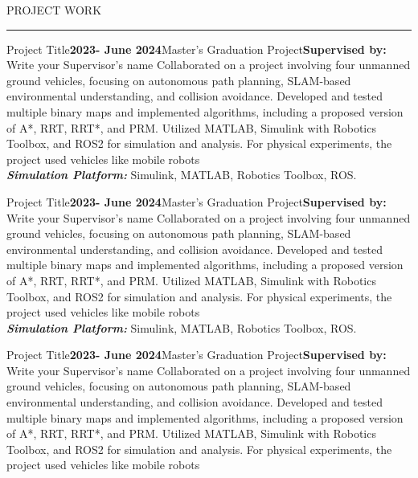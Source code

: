 \documentclass{resume} %
\renewenvironment{rSection}[1]{
\sectionskip
\textcolor{RoyalPurple}{\MakeUppercase{#1}}
\sectionlineskip
\hrule
\begin{list}{}{
\setlength{\leftmargin}{1.5em}
}
\item[]
}{
\end{list}
}
\begin{document}
\begin{rSection}{Project Work}


\begin{rSubsection}{Project Title}{\textbf{2023- June 2024}}{Master's Graduation Project}{\textbf{Supervised by:}  Write your Supervisor's name}
Collaborated on a project involving four unmanned ground vehicles, focusing on autonomous path planning, SLAM-based environmental understanding, and collision avoidance. Developed and tested multiple binary maps and implemented algorithms, including a proposed version of A*, RRT, RRT*, and PRM. Utilized MATLAB, Simulink with  Robotics Toolbox, and ROS2 for simulation and analysis. For physical experiments, the project used vehicles like mobile robots \\

\textit{\textbf{Simulation Platform:}} Simulink, MATLAB, Robotics Toolbox, ROS. \\
\end{rSubsection}


\begin{rSubsection}{Project Title}{\textbf{2023- June 2024}}{Master's Graduation Project}{\textbf{Supervised by:}  Write your Supervisor's name}
Collaborated on a project involving four unmanned ground vehicles, focusing on autonomous path planning, SLAM-based environmental understanding, and collision avoidance. Developed and tested multiple binary maps and implemented algorithms, including a proposed version of A*, RRT, RRT*, and PRM. Utilized MATLAB, Simulink with  Robotics Toolbox, and ROS2 for simulation and analysis. For physical experiments, the project used vehicles like mobile robots \\

\textit{\textbf{Simulation Platform:}} Simulink, MATLAB, Robotics Toolbox, ROS. \\
\end{rSubsection}


\begin{rSubsection}{Project Title}{\textbf{2023- June 2024}}{Master's Graduation Project}{\textbf{Supervised by:}  Write your Supervisor's name}
Collaborated on a project involving four unmanned ground vehicles, focusing on autonomous path planning, SLAM-based environmental understanding, and collision avoidance. Developed and tested multiple binary maps and implemented algorithms, including a proposed version of A*, RRT, RRT*, and PRM. Utilized MATLAB, Simulink with  Robotics Toolbox, and ROS2 for simulation and analysis. For physical experiments, the project used vehicles like mobile robots \\


\end{rSubsection}
\end{rSection}
\end{document}
